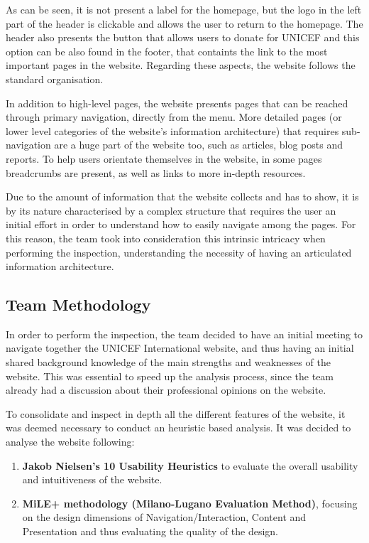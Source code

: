 As can be seen, it is not present a label for the homepage, but the logo in the left part of the header is clickable and allows the user to return to the homepage. The header also presents the button that allows users to donate for UNICEF and this option can be also found in the footer, that containts the link to the most important pages in the website.
Regarding these aspects, the website follows the standard organisation.

In addition to high-level pages, the website presents pages that can be reached through primary navigation, directly from the menu. 
More detailed pages (or lower level categories of the website's information architecture) that requires sub-navigation are a huge part of the website too, such as articles, blog posts and reports. To help users orientate themselves in the website, in some pages breadcrumbs are present, as well as links to more in-depth resources.

Due to the amount of information that the website collects and has to show, it is by its nature characterised by a complex structure that requires the user an initial effort in order to understand how to easily navigate among the pages. 
For this reason, the team took into consideration this intrinsic intricacy when performing the inspection, understanding the necessity of having an articulated information architecture.
\clearpage

\subsection{Team Methodology}
In order to perform the inspection, the team decided to have an initial meeting to navigate together the UNICEF International website, and thus having an initial shared background knowledge of the main strengths and weaknesses of the website. 
This was essential to speed up the analysis process, since the team already had a discussion about their professional opinions on the website.

To consolidate and inspect in depth all the different features of the website, it was deemed necessary to conduct an heuristic based analysis.
It was decided to analyse the website following:
\begin{enumerate}
    \item \textbf{Jakob Nielsen's 10 Usability Heuristics} to evaluate the overall usability and intuitiveness of the website.
    \item \textbf{MiLE+ methodology (Milano-Lugano Evaluation Method)}, focusing on the design dimensions of Navigation/Interaction, Content and Presentation and thus evaluating the quality of the design.
\end{enumerate}

